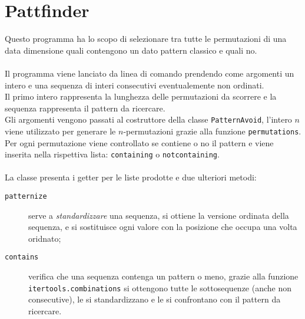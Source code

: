\section*{Pattfinder}
Questo programma ha lo scopo di selezionare tra tutte le permutazioni di una data dimensione quali contengono un dato pattern classico e quali no.\\\\
Il programma viene lanciato da linea di comando prendendo come argomenti un intero e una sequenza di interi consecutivi eventualemente non ordinati.\\
Il primo intero rappresenta la lunghezza delle permutazioni da scorrere e la sequenza rappresenta il pattern da ricercare.\\
Gli argomenti vengono passati al costruttore della classe \texttt{PatternAvoid}, l'intero $n$ viene utilizzato per generare le $n$-permutazioni grazie alla funzione \texttt{permutations}. Per ogni permutazione viene controllato se contiene o no il pattern e viene inserita nella rispettiva lista: \texttt{containing} o \texttt{notcontaining}.\\\\
La classe presenta i getter per le liste prodotte e due ulteriori metodi: 
\begin{description}
\item[\texttt{patternize}] serve a \textit{standardizzare} una sequenza, si ottiene la versione ordinata della sequenza, e si sostituisce ogni valore con la posizione che occupa una volta oridnato;  
\item[\texttt{contains}] verifica che una sequenza contenga un pattern o meno, grazie alla funzione \texttt{itertools.combinations} si ottengono tutte le sottosequenze (anche non consecutive), le si standardizzano e le si confrontano con il pattern da ricercare.
\end{description}

